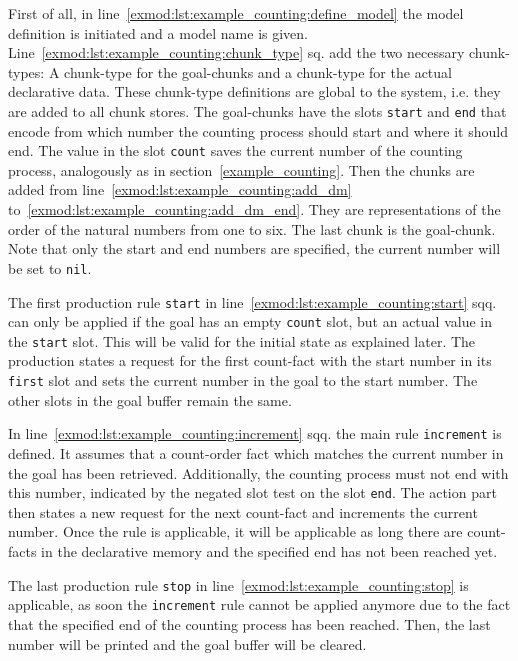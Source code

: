 First of all, in line~\ref{exmod:lst:example_counting:define_model} the model definition is initiated and a model name is given. Line~\ref{exmod:lst:example_counting:chunk_type} sq. add the two necessary chunk-types: A chunk-type for the goal-chunks and a chunk-type for the actual declarative data. These chunk-type definitions are global to the system, i.e. they are added to all chunk stores. The goal-chunks have the slots \lstinline|start| and \lstinline|end| that encode from which number the counting process should start and where it should end. The value in the slot \lstinline|count| saves the current number of the counting process, analogously as in section~\ref{example_counting}. Then the chunks are added from line~\ref{exmod:lst:example_counting:add_dm} to~\ref{exmod:lst:example_counting:add_dm_end}. They are representations of the order of the natural numbers from one to six. The last chunk is the goal-chunk. Note that only the start and end numbers are specified, the current number will be set to \lstinline|nil|.

The first production rule \lstinline|start| in line~\ref{exmod:lst:example_counting:start} sqq. can only be applied if the goal has an empty \lstinline|count| slot, but an actual value in the \lstinline|start| slot. This will be valid for the initial state as explained later. The production states a request for the first count-fact with the start number in its \lstinline|first| slot and sets the current number in the goal to the start number. The other slots in the goal buffer remain the same.

In line~\ref{exmod:lst:example_counting:increment} sqq. the main rule \lstinline|increment| is defined. It assumes that a count-order fact which matches the current number in the goal has been retrieved. Additionally, the counting process must not end with this number, indicated by the negated slot test on the slot \lstinline|end|. The action part then states a new request for the next count-fact and increments the current number. Once the rule is applicable, it will be applicable as long there are count-facts in the declarative memory and the specified end has not been reached yet.

The last production rule \lstinline|stop| in line~\ref{exmod:lst:example_counting:stop} is applicable, as soon the \lstinline|increment| rule cannot be applied anymore due to the fact that the specified end of the counting process has been reached. Then, the last number will be printed and the goal buffer will be cleared.

